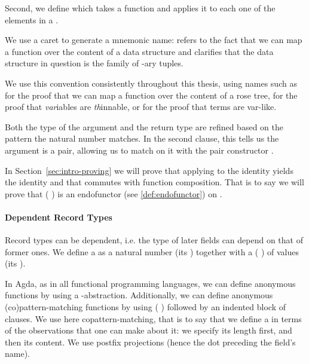 
Second, we define  which takes a function and
applies it to each one of the elements in a .

\begin{convention}
We use a caret to generate a mnemonic name:  refers to the fact
that we can map a function over the content of a data structure and
 clarifies that the data structure in question is the family
of -ary tuples.

We use this convention consistently throughout this thesis, using names
such as  for the proof that we can map a
function over the content of a rose tree, 
for the proof that \emph{var}iables are \emph{th}innable,
or  for the proof that terms are var-like.
\end{convention}

Both the type of the  argument and the  return type are
refined based on the pattern the natural number matches. In the second clause,
this tells us the  argument is a pair, allowing us to match on it
with the pair constructor \AIC{\_,\_}.


\begin{remark}[Functor]
In Section~\ref{sec:intro-proving} we will prove that applying
 to the identity yields the identity
and that  commutes with function
composition. That is to say we will prove that {( )}
is an endofunctor (see \cref{def:endofunctor}) on \Set.
\end{remark}

\paragraph{Dependent Record Types}

Record types can be dependent, i.e. the type of later fields can depend on that of
former ones. We define a  as a natural number (its ) together
with a ( ) of values (its ).


In Agda, as in all functional programming languages, we can define anonymous functions
by using a -abstraction. Additionally, we can define anonymous (co)pattern-matching
functions by using ( ) followed by an indented block of clauses.
We use here copattern-matching, that is to say that we define a  in terms
of the observations that one can make about it: we specify its length first, and
then its content. We use postfix projections (hence the dot preceding the field's name).

